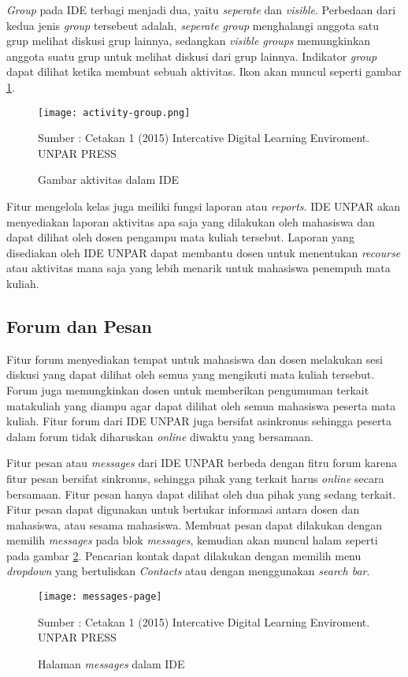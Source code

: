 \textit{Group} pada IDE terbagi menjadi dua, yaitu \textit{seperate} dan \textit{visible}. Perbedaan dari kedua jenis \textit{group} tersebeut adalah, \textit{seperate group} menghalangi anggota satu grup melihat diskusi grup lainnya, sedangkan \textit{visible groups} memungkinkan anggota suatu grup untuk melihat diskusi dari grup lainnya. Indikator \textit{group} dapat dilihat ketika membuat sebuah aktivitas. Ikon akan muncul seperti gambar \ref{fig:groups}.

\begin{figure} 
	\centering  
	\texttt{[image: activity-group.png]}  
	\caption[Gambar aktivitas dalam IDE] {Gambar aktivitas dalam IDE} 
			{Sumber : Cetakan 1 (2015) Intercative Digital Learning Enviroment. UNPAR PRESS}
	\label{fig:groups} 
\end{figure} 
Fitur mengelola kelas juga meiliki fungsi laporan atau \textit{reports}. IDE UNPAR akan menyediakan laporan aktivitas apa saja yang dilakukan oleh mahasiswa dan dapat dilihat oleh dosen pengampu mata kuliah tersebut. Laporan yang disediakan oleh IDE UNPAR dapat membantu dosen untuk menentukan \textit{recourse} atau aktivitas mana saja yang lebih menarik untuk mahasiswa penempuh mata kuliah.

\subsection{Forum dan Pesan}
Fitur forum menyediakan tempat untuk mahasiswa dan dosen melakukan sesi diskusi yang dapat dilihat oleh semua yang mengikuti mata kuliah tersebut. Forum juga memungkinkan dosen untuk memberikan pengumuman terkait matakuliah yang diampu agar dapat dilihat oleh semua mahasiswa peserta mata kuliah. Fitur forum dari IDE UNPAR juga bersifat asinkronus sehingga peserta dalam forum tidak diharuskan \textit{online} diwaktu yang bersamaan.

Fitur pesan atau \textit{messages} dari IDE UNPAR berbeda dengan fitru forum karena fitur pesan bersifat sinkronus, sehingga pihak yang terkait harus \textit{online} secara bersamaan. Fitur pesan hanya dapat dilihat oleh dua pihak yang sedang terkait. Fitur pesan dapat digunakan untuk bertukar informasi antara dosen dan mahasiswa, atau sesama mahasiswa. Membuat pesan dapat dilakukan dengan memilih \textit{messages} pada blok \textit{messages}, kemudian akan muncul halam seperti pada gambar \ref{fig:messages}. Pencarian kontak dapat dilakukan dengan memilih menu \textit{dropdown} yang bertuliskan \textit{Contacts} atau dengan menggunakan \textit{search bar}.
\begin{figure} [H]
	\centering  
	\texttt{[image: messages-page]}  
	\caption[Halaman \textit{messages} dalam IDE] {Halaman \textit{messages} dalam IDE}
{Sumber : Cetakan 1 (2015) Intercative Digital Learning Enviroment. UNPAR PRESS} 
	\label{fig:messages} 
\end{figure} 
   

